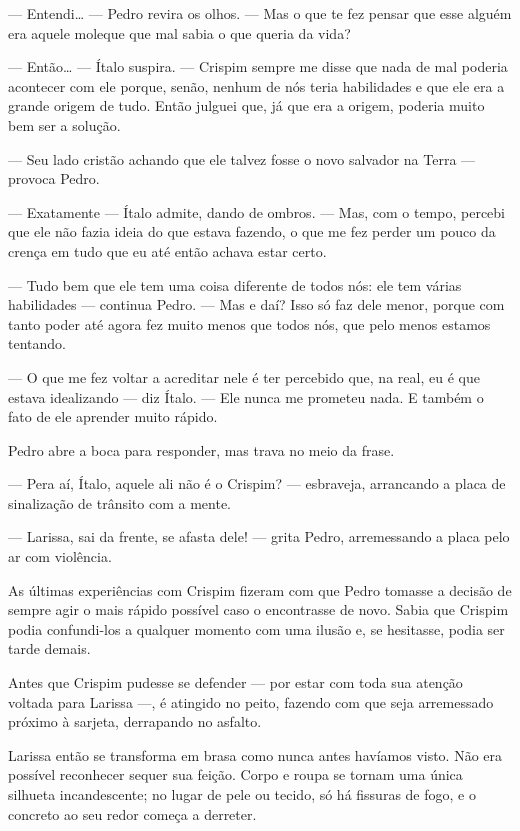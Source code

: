 — Entendi… — Pedro revira os olhos. — Mas o que te fez pensar que esse alguém era aquele moleque que mal sabia o que queria da vida?

— Então… — Ítalo suspira. — Crispim sempre me disse que nada de mal poderia acontecer com ele porque, senão, nenhum de nós teria habilidades e que ele era a grande origem de tudo.  
Então julguei que, já que era a origem, poderia muito bem ser a solução.

— Seu lado cristão achando que ele talvez fosse o novo salvador na Terra — provoca Pedro.

— Exatamente — Ítalo admite, dando de ombros. — Mas, com o tempo, percebi que ele não fazia ideia do que estava fazendo, o que me fez perder um pouco da crença em tudo que eu até então achava estar certo.

— Tudo bem que ele tem uma coisa diferente de todos nós: ele tem várias habilidades — continua Pedro. — Mas e daí? Isso só faz dele menor, porque com tanto poder até agora fez muito menos que todos nós, que pelo menos estamos tentando.

— O que me fez voltar a acreditar nele é ter percebido que, na real, eu é que estava idealizando — diz Ítalo. — Ele nunca me prometeu nada. E também o fato de ele aprender muito rápido.

Pedro abre a boca para responder, mas trava no meio da frase.

— Pera aí, Ítalo, aquele ali não é o Crispim? — esbraveja, arrancando a placa de sinalização de trânsito com a mente.

\bigskip

— Larissa, sai da frente, se afasta dele! — grita Pedro, arremessando a placa pelo ar com violência.

As últimas experiências com Crispim fizeram com que Pedro tomasse a decisão de sempre agir o mais rápido possível caso o encontrasse de novo. Sabia que Crispim podia confundi-los a qualquer momento com uma ilusão e, se hesitasse, podia ser tarde demais.

Antes que Crispim pudesse se defender — por estar com toda sua atenção voltada para Larissa —, é atingido no peito, fazendo com que seja arremessado próximo à sarjeta, derrapando no asfalto.

Larissa então se transforma em brasa como nunca antes havíamos visto. Não era possível reconhecer sequer sua feição. Corpo e roupa se tornam uma única silhueta incandescente; no lugar de pele ou tecido, só há fissuras de fogo, e o concreto ao seu redor começa a derreter.

